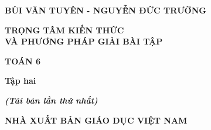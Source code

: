 \documentclass[12pt,a4paper,oneside]{book}
\theoremstyle{nonumberplain}
\begin{document}
\begin{titlepage}
\pagestyle{empty}
\begin{center}
	\fontsize{16}{0}\selectfont\textbf{BÙI VĂN TUYÊN - NGUYỄN ĐỨC TRƯỜNG}\\
\end{center}
\vspace{6cm}
\begin{center}
	\textbf{\fontsize{24}{0}\selectfont TRỌNG TÂM KIẾN THỨC\\ VÀ PHƯƠNG PHÁP GIẢI BÀI TẬP}\\
\end{center}		
\begin{center}
	\textbf{\fontsize{40}{0}\selectfont TOÁN 6}
\end{center}
\begin{center}
	\textbf{\fontsize{18}{0}\selectfont Tập hai}
\end{center}
\begin{center}
	\textit{\textbf{\fontsize{14}{0}\selectfont (Tái bản lần thứ nhất)}}
\end{center}
\vfill{
	\begin{center}
		\fontsize{14}{0}\textbf{NHÀ XUẤT BẢN GIÁO DỤC VIỆT NAM}
	\end{center}
}
\end{titlepage}
	\pagestyle{fancy}
\chead{\empty}
\rhead{\currfilename}
\lfoot{\empty}

\tableofcontents
\end{document}
